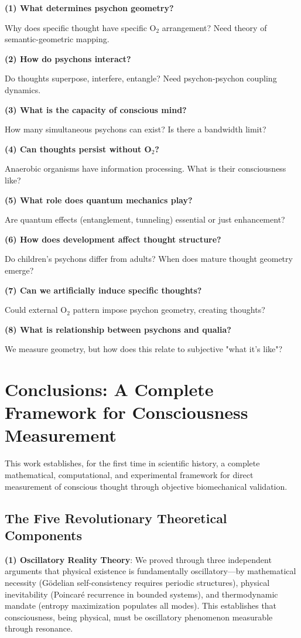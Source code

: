 \documentclass[11pt,onecolumn]{article}
\begin{document}
\textbf{(1) What determines psychon geometry?}

Why does specific thought have specific O$_2$ arrangement? Need theory of semantic-geometric mapping.

\textbf{(2) How do psychons interact?}

Do thoughts superpose, interfere, entangle? Need psychon-psychon coupling dynamics.

\textbf{(3) What is the capacity of conscious mind?}

How many simultaneous psychons can exist? Is there a bandwidth limit?

\textbf{(4) Can thoughts persist without O$_2$?}

Anaerobic organisms have information processing. What is their consciousness like?

\textbf{(5) What role does quantum mechanics play?}

Are quantum effects (entanglement, tunneling) essential or just enhancement?

\textbf{(6) How does development affect thought structure?}

Do children's psychons differ from adults? When does mature thought geometry emerge?

\textbf{(7) Can we artificially induce specific thoughts?}

Could external O$_2$ pattern impose psychon geometry, creating thoughts?

\textbf{(8) What is relationship between psychons and qualia?}

We measure geometry, but how does this relate to subjective "what it's like"?

\clearpage

\section{Conclusions: A Complete Framework for Consciousness Measurement}

This work establishes, for the first time in scientific history, a complete mathematical, computational, and experimental framework for direct measurement of conscious thought through objective biomechanical validation.

\subsection{The Five Revolutionary Theoretical Components}

\textbf{(1) Oscillatory Reality Theory}: We proved through three independent arguments that physical existence is fundamentally oscillatory---by mathematical necessity (G\"odelian self-consistency requires periodic structures), physical inevitability (Poincar\'e recurrence in bounded systems), and thermodynamic mandate (entropy maximization populates all modes). This establishes that consciousness, being physical, must be oscillatory phenomenon measurable through resonance.
\end{document}
